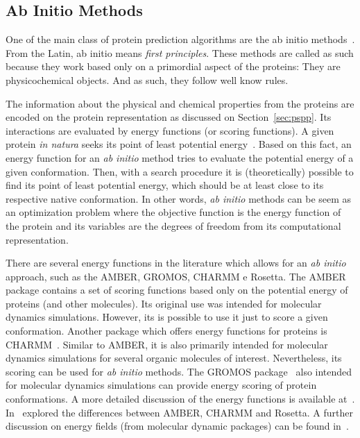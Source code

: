 \subsection{Ab Initio Methods}\label{sec:ab-initio}

One of the main class of protein prediction algorithms are the ab initio
methods~\cite{lee2017ab}. From the Latin, ab initio means \textit{first
principles}. These methods are called as such because they work based only on a
primordial aspect of the proteins: They are physicochemical objects. And as
such, they follow well know rules.

The information about the physical and chemical properties from the proteins
are encoded on the protein representation as discussed on
Section~\ref{sec:pspp}. Its interactions are evaluated by energy functions (or
scoring functions). A given protein \textit{in natura} seeks its point of least
potential energy~\cite{anfinsen1973principles}. Based on this fact, an energy
function for an \textit{ab initio} method tries to evaluate the potential
energy of a given conformation. Then, with a search procedure it is
(theoretically) possible to find its point of least potential energy, which
should be at least close to its respective native conformation. In other words,
\textit{ab initio} methods can be seem as an optimization problem where the
objective function is the energy function of the protein and its variables are
the degrees of freedom from its computational representation.

There are several energy functions in the literature which allows for an
\textit{ab initio} approach, such as the \ac{AMBER}, \ac{GROMOS}, \ac{CHARMM} e
Rosetta.  The \ac{AMBER}~\cite{salomon2013overview} package contains a set of
scoring functions based only on the potential energy of proteins (and other
molecules). Its original use was intended for molecular dynamics simulations.
However, its is possible to use it just to score a given conformation. Another
package which offers energy functions for proteins is
\ac{CHARMM}~\cite{brooks2009charmm}. Similar to \ac{AMBER}, it is also
primarily intended for molecular dynamics simulations for several organic
molecules of interest. Nevertheless, its scoring can be used for \textit{ab
initio} methods. The \ac{GROMOS} package~\cite{eichenberger2011gromos++} also
intended for molecular dynamics simulations can provide energy scoring of
protein conformations. A more detailed discussion of the energy functions is
available at~\cite{dorn2014three}. In~\cite{narloch2016diversification}
explored the differences between \ac{AMBER}, \ac{CHARMM} and Rosetta. A further
discussion on energy fields (from molecular dynamic packages) can be found
in~\cite{vlachakis2014current}.

